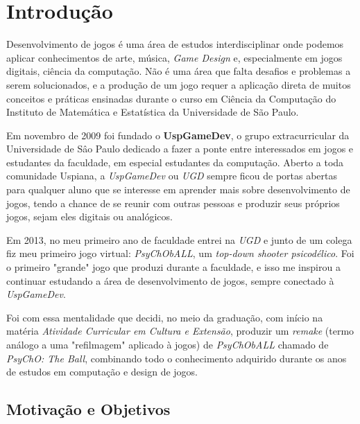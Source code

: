 \chapter{Introdução}
\label{cap:introducao}

  Desenvolvimento de jogos é uma área de estudos interdisciplinar onde podemos aplicar conhecimentos de arte, música, \textit{Game Design} e, especialmente em jogos digitais, ciência da computação. Não é uma área que falta desafios e problemas a serem solucionados, e a produção de um jogo requer a aplicação direta de muitos conceitos e práticas ensinadas durante o curso em Ciência da Computação do Instituto de Matemática e Estatística da Universidade de São Paulo.

  Em novembro de 2009 foi fundado o \textbf{UspGameDev}, o grupo extracurricular da Universidade de Sâo Paulo dedicado a fazer a ponte entre interessados em jogos e estudantes da faculdade, em especial estudantes da computação. Aberto a toda comunidade Uspiana, a \textit{UspGameDev} ou \textit{UGD} sempre ficou de portas abertas para qualquer aluno que se interesse em aprender mais sobre desenvolvimento de jogos, tendo a chance de se reunir com outras pessoas e produzir seus próprios jogos, sejam eles digitais ou analógicos.

  Em 2013, no meu primeiro ano de faculdade entrei na \textit{UGD} e junto de um colega fiz meu primeiro jogo virtual: \textit{PsyChObALL}, um \textit{top-down shooter psicodélico}. Foi o primeiro "grande" jogo que produzi durante a faculdade, e isso me inspirou a continuar estudando a área de desenvolvimento de jogos, sempre conectado à \textit{UspGameDev}.

  Foi com essa mentalidade que decidi, no meio da graduação, com início na matéria \textit{Atividade Curricular em Cultura e Extensão}, produzir um \textit{remake} (termo análogo a uma "refilmagem" aplicado à jogos) de \textit{PsyChObALL} chamado de \textit{PsyChO: The Ball}, combinando todo o conhecimento adquirido durante os anos de estudos em computação e design de jogos.


\section{Motivação e Objetivos}
\label{sec:motivacao_objetivo}

